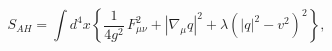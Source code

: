 \begin{equation}
\label{ah}
S_{AH}=\int d^4x\left\{\frac1{4g^2}\,F^2_{\mu\nu}+|\nabla_\mu
q|^2+\lambda(|q|^2-v^2)^2\right\},
\end{equation}

